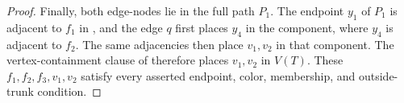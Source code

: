 \begin{proof}
Finally, both edge-nodes lie in the full path $P_1$.  The endpoint $y_1$
of $P_1$ is adjacent to $f_1$ in , and
the edge $q$ first places $y_4$ in the component, where $y_4$ is adjacent
to $f_2$.  The same adjacencies then place $v_1,v_2$ in that component.
The vertex-containment clause of 
therefore places $v_1,v_2$ in $V(T)$.  These
$f_1,f_2,f_3,v_1,v_2$ satisfy every asserted endpoint, color, membership,
and outside-trunk condition.
\end{proof}
